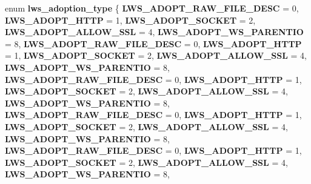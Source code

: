 \begin{DoxyCompactItemize}
\item 
\mbox{\label{group__sock-adopt_ga7e944a23efbb50187d34c62fb841d071}} 
enum {\bfseries lws\+\_\+adoption\+\_\+type} \{ \newline
{\bfseries L\+W\+S\+\_\+\+A\+D\+O\+P\+T\+\_\+\+R\+A\+W\+\_\+\+F\+I\+L\+E\+\_\+\+D\+E\+SC} = 0, 
{\bfseries L\+W\+S\+\_\+\+A\+D\+O\+P\+T\+\_\+\+H\+T\+TP} = 1, 
{\bfseries L\+W\+S\+\_\+\+A\+D\+O\+P\+T\+\_\+\+S\+O\+C\+K\+ET} = 2, 
{\bfseries L\+W\+S\+\_\+\+A\+D\+O\+P\+T\+\_\+\+A\+L\+L\+O\+W\+\_\+\+S\+SL} = 4, 
\newline
{\bfseries L\+W\+S\+\_\+\+A\+D\+O\+P\+T\+\_\+\+W\+S\+\_\+\+P\+A\+R\+E\+N\+T\+IO} = 8, 
{\bfseries L\+W\+S\+\_\+\+A\+D\+O\+P\+T\+\_\+\+R\+A\+W\+\_\+\+F\+I\+L\+E\+\_\+\+D\+E\+SC} = 0, 
{\bfseries L\+W\+S\+\_\+\+A\+D\+O\+P\+T\+\_\+\+H\+T\+TP} = 1, 
{\bfseries L\+W\+S\+\_\+\+A\+D\+O\+P\+T\+\_\+\+S\+O\+C\+K\+ET} = 2, 
\newline
{\bfseries L\+W\+S\+\_\+\+A\+D\+O\+P\+T\+\_\+\+A\+L\+L\+O\+W\+\_\+\+S\+SL} = 4, 
{\bfseries L\+W\+S\+\_\+\+A\+D\+O\+P\+T\+\_\+\+W\+S\+\_\+\+P\+A\+R\+E\+N\+T\+IO} = 8, 
{\bfseries L\+W\+S\+\_\+\+A\+D\+O\+P\+T\+\_\+\+R\+A\+W\+\_\+\+F\+I\+L\+E\+\_\+\+D\+E\+SC} = 0, 
{\bfseries L\+W\+S\+\_\+\+A\+D\+O\+P\+T\+\_\+\+H\+T\+TP} = 1, 
\newline
{\bfseries L\+W\+S\+\_\+\+A\+D\+O\+P\+T\+\_\+\+S\+O\+C\+K\+ET} = 2, 
{\bfseries L\+W\+S\+\_\+\+A\+D\+O\+P\+T\+\_\+\+A\+L\+L\+O\+W\+\_\+\+S\+SL} = 4, 
{\bfseries L\+W\+S\+\_\+\+A\+D\+O\+P\+T\+\_\+\+W\+S\+\_\+\+P\+A\+R\+E\+N\+T\+IO} = 8, 
{\bfseries L\+W\+S\+\_\+\+A\+D\+O\+P\+T\+\_\+\+R\+A\+W\+\_\+\+F\+I\+L\+E\+\_\+\+D\+E\+SC} = 0, 
\newline
{\bfseries L\+W\+S\+\_\+\+A\+D\+O\+P\+T\+\_\+\+H\+T\+TP} = 1, 
{\bfseries L\+W\+S\+\_\+\+A\+D\+O\+P\+T\+\_\+\+S\+O\+C\+K\+ET} = 2, 
{\bfseries L\+W\+S\+\_\+\+A\+D\+O\+P\+T\+\_\+\+A\+L\+L\+O\+W\+\_\+\+S\+SL} = 4, 
{\bfseries L\+W\+S\+\_\+\+A\+D\+O\+P\+T\+\_\+\+W\+S\+\_\+\+P\+A\+R\+E\+N\+T\+IO} = 8, 
\newline
{\bfseries L\+W\+S\+\_\+\+A\+D\+O\+P\+T\+\_\+\+R\+A\+W\+\_\+\+F\+I\+L\+E\+\_\+\+D\+E\+SC} = 0, 
{\bfseries L\+W\+S\+\_\+\+A\+D\+O\+P\+T\+\_\+\+H\+T\+TP} = 1, 
{\bfseries L\+W\+S\+\_\+\+A\+D\+O\+P\+T\+\_\+\+S\+O\+C\+K\+ET} = 2, 
{\bfseries L\+W\+S\+\_\+\+A\+D\+O\+P\+T\+\_\+\+A\+L\+L\+O\+W\+\_\+\+S\+SL} = 4, 
\newline
{\bfseries L\+W\+S\+\_\+\+A\+D\+O\+P\+T\+\_\+\+W\+S\+\_\+\+P\+A\+R\+E\+N\+T\+IO} = 8, 

\end{DoxyCompactItemize}
